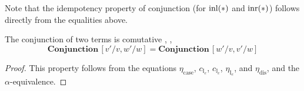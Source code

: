  
  Note that the idempotency property of conjunction (for $\mathrm{inl}(*)$ and $\mathrm{inr}(*)$) follows directly from the equalities above.


\begin{lemma} \label{lem:comm}
  The conjunction of two terms is comutative , \ie,
 $$ \textbf{Conjunction} \, [v'/v,w'/w ] = \textbf{Conjunction} \, [w'/v,v'/w ]  $$ 
\end{lemma}




\begin{proof}
  This property follows from the equations $\eta_{\text{case}}$,  $c_{\mathbb{I}_{e}}$, $c_{\mathbb{I}_{e}}$, $\eta_{\mathbb{I}_{e}}$, and $\eta_{\text{dis}}$, and the $\alpha$-equivalence.
  

\end{proof}
